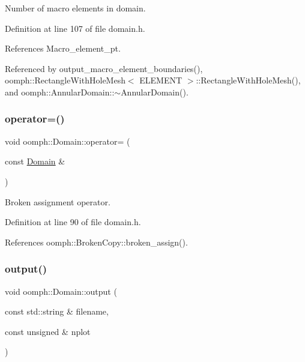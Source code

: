 Number of macro elements in domain. 



Definition at line 107 of file domain.\+h.



References Macro\+\_\+element\+\_\+pt.



Referenced by output\+\_\+macro\+\_\+element\+\_\+boundaries(), oomph\+::\+Rectangle\+With\+Hole\+Mesh$<$ E\+L\+E\+M\+E\+N\+T $>$\+::\+Rectangle\+With\+Hole\+Mesh(), and oomph\+::\+Annular\+Domain\+::$\sim$\+Annular\+Domain().

\mbox{\label{classoomph_1_1Domain_a43b1baf8fcafd4a75d54cf915e4dca44}} 
\subsubsection{\texorpdfstring{operator=()}{operator=()}}
{\footnotesize\ttfamily void oomph\+::\+Domain\+::operator= (\begin{DoxyParamCaption}\item[{const \hyperlink{classoomph_1_1Domain}{Domain} \&}]{ }\end{DoxyParamCaption})\hspace{0.3cm}{\ttfamily [inline]}}



Broken assignment operator. 



Definition at line 90 of file domain.\+h.



References oomph\+::\+Broken\+Copy\+::broken\+\_\+assign().

\mbox{\label{classoomph_1_1Domain_a7b0c50db44e3bc3c8ae1a0d34ac835c8}} 
\subsubsection{\texorpdfstring{output()}{output()}\hspace{0.1cm}{\footnotesize\ttfamily [1/2]}}
{\footnotesize\ttfamily void oomph\+::\+Domain\+::output (\begin{DoxyParamCaption}\item[{const std\+::string \&}]{filename,  }\item[{const unsigned \&}]{nplot }\end{DoxyParamCaption})\hspace{0.3cm}{\ttfamily [inline]}}



